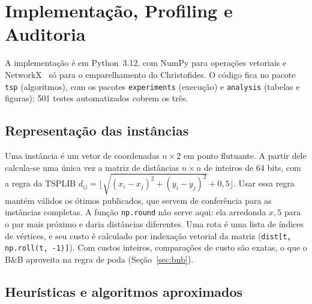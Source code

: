 \section{Implementação, Profiling e Auditoria}\label{sec:impl}

A implementação é em Python~3.12, com NumPy para operações vetoriais e
NetworkX~\cite{hagberg2008} só para o emparelhamento do Christofides. O código fica no
pacote \texttt{tsp} (algoritmos), com os pacotes \texttt{experiments} (execução) e
\texttt{analysis} (tabelas e figuras); 501 testes automatizados cobrem os três.

\subsection{Representação das instâncias}

Uma instância é um vetor de coordenadas $n \times 2$ em ponto flutuante. A partir dele
calcula-se uma única vez a matriz de distâncias $n \times n$ de inteiros de 64 bits, com
a regra da TSPLIB $d_{ij} = \lfloor \sqrt{(x_i-x_j)^2 + (y_i-y_j)^2} + 0{,}5 \rfloor$.
Usar essa regra mantém válidos os ótimos publicados, que servem de conferência para as
instâncias completas. A função \texttt{np.round} não serve aqui: ela arredonda
$x{,}5$ para o par mais próximo e daria distâncias diferentes. Uma rota é uma lista de
índices de vértices, e seu custo é calculado por indexação vetorial da matriz
(\texttt{dist[t, np.roll(t, -1)]}). Com custos inteiros, comparações de custo são exatas,
o que o B\&B aproveita na regra de poda (Seção~\ref{sec:bnb}).

\subsection{Heurísticas e algoritmos aproximados}

